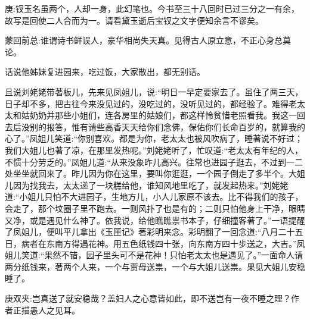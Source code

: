 

\begin{parag}
    \begin{note}庚:钗玉名虽两个，人却一身，此幻笔也。今书至三十八回时已过三分之一有余，故写是回使二人合而为一。请看黛玉逝后宝钗之文字便知余言不谬矣。\end{note}
\end{parag}


\begin{parag}
    \begin{note}蒙回前总:谁谓诗书鲜误人，豪华相尚失天真。见得古人原立意，不正心身总莫论。\end{note}
\end{parag}


\begin{parag}
    话说他姊妹复进园来，吃过饭，大家散出，都无别话。
\end{parag}


\begin{parag}
    且说刘姥姥带著板儿，先来见凤姐儿，说:“明日一早定要家去了。虽住了两三天，日子却不多，把古往今来没见过的，没吃过的，没听见过的，都经验了。难得老太太和姑奶奶并那些小姐们，连各房里的姑娘们，都这样怜贫惜老照看我。我这一回去后没别的报答，惟有请些高香天天给你们念佛，保佑你们长命百岁的，就算我的心了。”凤姐儿笑道:“你别喜欢。都是为你，老太太也被风吹病了，睡著说不好过；我们大姐儿也著了凉，在那里发热呢。”刘姥姥听了，忙叹道:“老太太有年纪的人，不惯十分劳乏的。”凤姐儿道:“从来没象昨儿高兴。往常也进园子逛去，不过到一二处坐坐就回来了。昨儿因为你在这里，要叫你逛逛，一个园子倒走了多半个。大姐儿因为找我去，太太递了一块糕给他，谁知风地里吃了，就发起热来。”刘姥姥道:“小姐儿只怕不大进园子，生地方儿，小人儿家原不该去。比不得我们的孩子，会走了，那个坟圈子里不跑去。一则风扑了也是有的；二则只怕他身上干净，眼睛又净，或是遇见什么神了。依我说，给他瞧瞧祟书本子，仔细撞客著了。”一语提醒了凤姐儿，便叫平儿拿出《玉匣记》著彩明来念。彩明翻了一回念道:“八月二十五日，病者在东南方得遇花神。用五色纸钱四十张，向东南方四十步送之，大吉。”凤姐儿笑道:“果然不错，园子里头可不是花神！只怕老太太也是遇见了。”一面命人请两分纸钱来，著两个人来，一个与贾母送祟，一个与大姐儿送祟。果见大姐儿安稳睡了。\begin{note}庚双夹:岂真送了就安稳哉？盖妇人之心意皆如此，即不送岂有一夜不睡之理？作者正描愚人之见耳。\end{note}
\end{parag}


